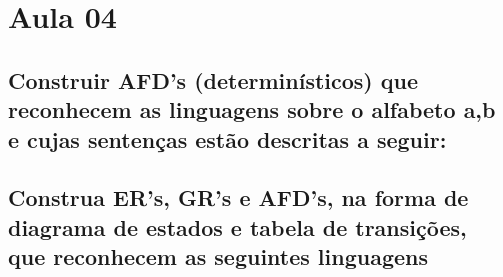 \section{Aula 04}
    \subsection{Construir AFD’s (determinísticos) que reconhecem as linguagens sobre o alfabeto {a,b} e cujas sentenças estão descritas a seguir:}
    
    \subsection{Construa ER's, GR's e AFD's, na forma de diagrama de estados e tabela de transições, que reconhecem as seguintes linguagens}
